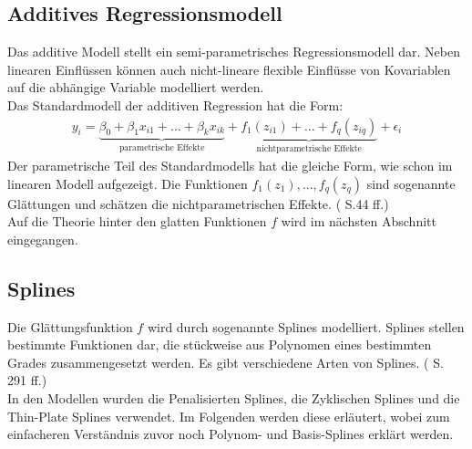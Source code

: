 \documentclass[12pt]{scrreprt}
\begin{document}
\subsection{Additives Regressionsmodell}
Das additive Modell stellt ein semi-parametrisches Regressionsmodell dar. Neben linearen Einflüssen können auch nicht-lineare flexible Einﬂüsse von Kovariablen auf die abhängige Variable modelliert werden. \\
Das Standardmodell der additiven Regression hat die Form:
\begin{align}
y_{i}=\underbrace{\beta_{0}+\beta_{1}x_{i1}+...+\beta_{k}x_{ik}}_{\text{parametrische Effekte}}+ \underbrace{f_{1}(z_{i1})+...+f_{q}(z_{iq})}_{\text{nichtparametrische Effekte}}+\epsilon_{i}
\end{align}
Der parametrische Teil des Standardmodells hat die gleiche Form, wie schon im linearen Modell aufgezeigt. Die Funktionen $f_{1}(z_{1}),...,f_{q}(z_{q})$ sind sogenannte Glättungen und schätzen die nichtparametrischen Effekte. (\cite{fahrmeir2007regression} S.44 ff.) \\
Auf die Theorie hinter den glatten Funktionen $f$ wird im nächsten Abschnitt eingegangen.

\subsection{Splines}
Die Glättungsfunktion $f$ wird durch sogenannte Splines modelliert. Splines stellen bestimmte Funktionen dar, die stückweise aus Polynomen eines bestimmten Grades zusammengesetzt werden. Es gibt verschiedene Arten von Splines. (\cite{fahrmeir2007regression} S. 291 ff.) \\
In den Modellen wurden die Penalisierten Splines, die Zyklischen Splines und die Thin-Plate Splines verwendet. Im Folgenden werden diese erläutert, wobei zum einfacheren Verständnis zuvor noch Polynom- und Basis-Splines erklärt werden.
\end{document}
